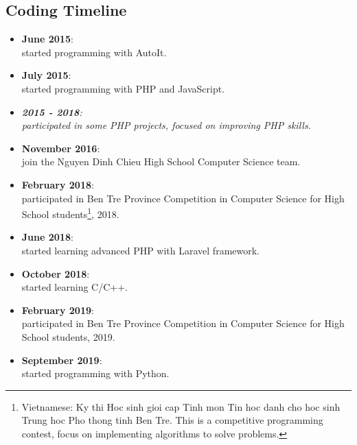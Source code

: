 \documentclass{article}
\begin{document}
        \subsection{Coding Timeline}
            \begin{itemize}
                \item {\bfseries{June 2015}}: \\
                    started programming with AutoIt.

                \item {\bfseries{July 2015}}: \\
                    started programming with PHP and JavaScript.

                \item {\itshape{{\bfseries{2015 - 2018}}: \\
                    participated in some PHP projects, focused on improving PHP skills.}}

                \item {\bfseries{November 2016}}: \\
                    join the Nguyen Dinh Chieu High School Computer Science team.

                \item {\bfseries{February 2018}}: \\
                    participated in Ben Tre Province Competition in Computer Science for High School students\footnote{Vietnamese: Ky thi Hoc sinh gioi cap Tinh mon Tin hoc danh cho hoc sinh Trung hoc Pho thong tinh Ben Tre. This is a competitive programming contest, focus on implementing algorithms to solve problems.}, 2018.

                \item {\bfseries{June 2018}}: \\
                    started learning advanced PHP with Laravel framework.

                \item {\bfseries{October 2018}}: \\
                    started learning C/C++.

                \item {\bfseries{February 2019}}: \\
                    participated in Ben Tre Province Competition in Computer Science for High School students, 2019.

                \item {\bfseries{September 2019}}: \\
                    started programming with Python.
            \end{itemize}
\end{document}

